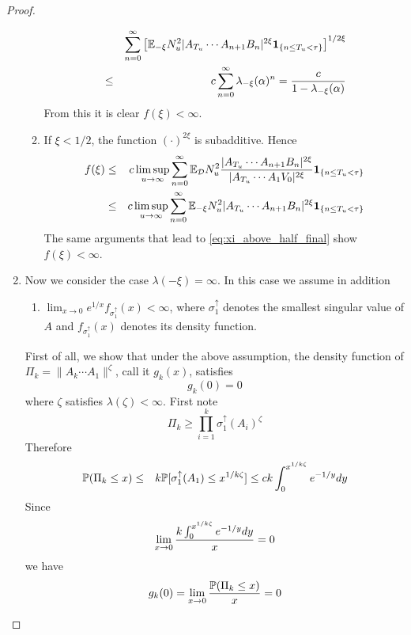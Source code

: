 \documentclass{article}
\theoremstyle{remark}
\begin{document}
\begin{proof}
\begin{enumerate}
\begin{enumerate}
\begin{eqnarray*}
        && \sum_{n=0}^{\infty}
        \left[
          \E_{-\xi} N_u^2 
          |A_{T_u} \cdots A_{n+1} B_n|^{2\xi}
          \1{n \leq T_u < \tau}
        \right]^{1/2\xi} \\
        &\leq& c \sum_{n=0}^{\infty} \lambda_{-\xi}(\alpha)^n
        = {c \over 1 - \lambda_{-\xi}(\alpha)}
      \end{eqnarray*}
      From this it is clear $f(\xi) < \infty$.
      \item If $\xi < 1/2$, the function $(\cdot)^{2\xi}$ is
        subadditive. Hence
        \begin{eqnarray*}
          f(\xi) &\leq& c \limsup_{u \to \infty}
          \sum_{n=0}^\infty \E_{\mathcal D} N_u^2
          {|A_{T_u} \cdots A_{n+1}B_n|^{2\xi}
            \over
            |A_{T_u} \cdots A_1 V_0|^{2\xi}
          }
          \1{n \leq T_u < \tau} \\
          &\leq& c \limsup_{u \to \infty}
          \sum_{n=0}^{\infty}
            \E_{-\xi} N_u^2 
            |A_{T_u} \cdots A_{n+1} B_n|^{2\xi}
            \1{n \leq T_u < \tau}
        \end{eqnarray*}
        The same arguments that lead to \eqref{eq:xi_above_half_final}
        show $f(\xi) < \infty$.
    \end{enumerate}
  \item Now we consider the case $\lambda(-\xi) = \infty$. In this
    case we assume in addition
    \begin{enumerate}
    \item $\lim_{x \to 0} e^{1/x} f_{\sigma_1^{\uparrow}}(x)  <
      \infty$, where $\sigma_1^{\uparrow}$ denotes the smallest
      singular value of $A$ and $f_{\sigma_1^{\uparrow}}(x)$ denotes its
      density function.
    \end{enumerate}
    First of all, we show that under the above assumption, the density
    function of $\Pi_k = \|A_k \cdots A_1\|^\zeta$, call it $g_k(x)$,
    satisfies
    \[
    g_k(0) = 0
    \]
    where $\zeta$ satisfies $\lambda(\zeta) < \infty$. First note
    \[
    \Pi_k \geq \prod_{i=1}^k \sigma_1^{\uparrow}(A_i)^\zeta
    \]
    Therefore
    \begin{eqnarray*}
      \P(\Pi_k \leq x) &\leq& k \P[\sigma_1^{\uparrow}(A_1)
      \leq x^{1/k \zeta}] \leq c k \int_0^{x^{1/k\zeta}} e^{-1/y} dy
    \end{eqnarray*}
    Since
    \[
    \lim_{x \to 0} {k \int_0^{x^{1/k\zeta}} e^{-1/y} dy \over x} = 0
    \]
    we have
    \[
    g_k(0) = \lim_{x \to 0} {\P(\Pi_k \leq x) \over x} = 0
\]
\end{enumerate}
\end{proof}
\end{document}

